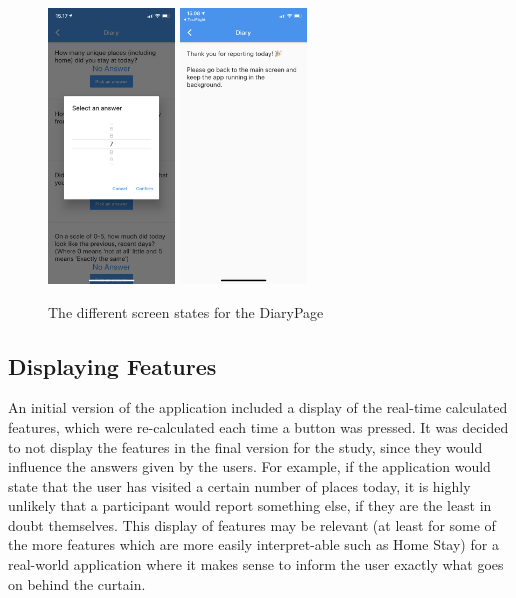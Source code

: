 \begin{figure}
    \includegraphics[width=0.3\textwidth]{images/app_imgs/app_answering.png} \includegraphics[width=0.3\textwidth]{images/app_imgs/app_submitted.png}
    \caption{The different screen states for the DiaryPage}
    \label{fig:my_label}
\end{figure}

\subsection{Displaying Features}
An initial version of the application included a display of the real-time calculated features, which were re-calculated each time a button was pressed. It was decided to not display the features in the final version for the study, since they would influence the answers given by the users. For example, if the application would state that the user has visited a certain number of places today, it is highly unlikely that a participant would report something else, if they are the least in doubt themselves. This display of features may be relevant (at least for some of the more features which are more easily interpret-able such as Home Stay) for a real-world application where it makes sense to inform the user exactly what goes on behind the curtain.

